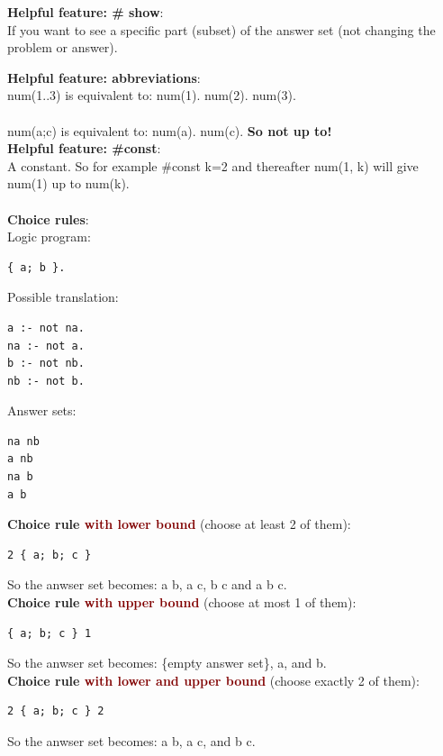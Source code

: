 \vspace{0.25cm}
\textbf{Helpful feature: \# show}: \\
If you want to see a specific part (subset) of the answer set (not changing the problem or answer). 

\newpage
\textbf{Helpful feature: abbreviations}: \\
num(1..3) is equivalent to: num(1). num(2). num(3).  \\
\\
num(a;c) is equivalent to: num(a). num(c). \textbf{So not up to!} \\

\vspace{0.25cm}
\textbf{Helpful feature: \#const}: \\
A constant. So for example \#const k=2 and thereafter num(1, k) will give num(1) up to num(k). \\
\\
\textbf{Choice rules}: \\
Logic program:
\begin{lstlisting}
{ a; b }.
\end{lstlisting}

\begin{minipage}{0.5\textwidth}
Possible translation:
\begin{lstlisting}
a :- not na.
na :- not a.
b :- not nb.
nb :- not b.
\end{lstlisting}
\end{minipage}
\begin{minipage}{0.5\textwidth}
Answer sets:
\begin{lstlisting}
na nb
a nb
na b
a b
\end{lstlisting}
\end{minipage}

\textbf{Choice rule \textcolor{Maroon}{with lower bound}} (choose at least 2 of them): 
\begin{lstlisting}
2 { a; b; c }
\end{lstlisting}
So the anwser set becomes: a b, a c, b c and a b c.\\

\textbf{Choice rule \textcolor{Maroon}{with upper bound}} (choose at most 1 of them): 
\begin{lstlisting}
{ a; b; c } 1
\end{lstlisting}
So the anwser set becomes: \{empty answer set\}, a, and b. \\

\textbf{Choice rule \textcolor{Maroon}{with lower and upper bound}} (choose exactly 2 of them): 
\begin{lstlisting}
2 { a; b; c } 2
\end{lstlisting}
So the anwser set becomes: a b, a c, and b c. \\
\\


